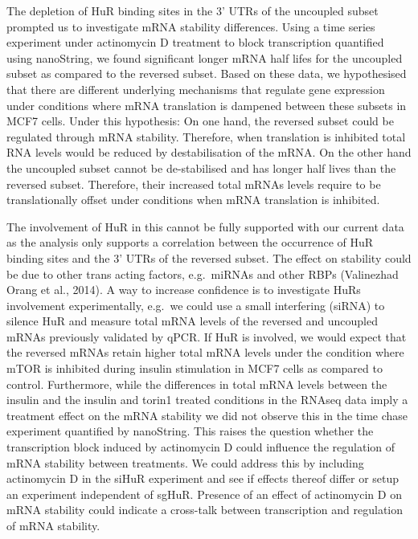 \documentclass[12pt,openany]{book}
\begin{document}
The depletion of HuR binding sites in the 3' UTRs of the uncoupled
subset prompted us to investigate mRNA stability differences. Using a
time series experiment under actinomycin D treatment to block
transcription quantified using nanoString, we found significant longer
mRNA half lifes for the uncoupled subset as compared to the reversed
subset. Based on these data, we hypothesised that there are different
underlying mechanisms that regulate gene expression under conditions
where mRNA translation is dampened between these subsets in MCF7 cells.
Under this hypothesis: On one hand, the reversed subset could be
regulated through mRNA stability. Therefore, when translation is
inhibited total RNA levels would be reduced by destabilisation of the
mRNA. On the other hand the uncoupled subset cannot be de-stabilised and
has longer half lives than the reversed subset. Therefore, their
increased total mRNAs levels require to be translationally offset under
conditions when mRNA translation is inhibited.

The involvement of HuR in this cannot be fully supported with our
current data as the analysis only supports a correlation between the
occurrence of HuR binding sites and the 3' UTRs of the reversed subset.
The effect on stability could be due to other trans acting factors,
e.g.~miRNAs and other RBPs (Valinezhad Orang et al., 2014). A way to
increase confidence is to investigate HuRs involvement experimentally,
e.g.~we could use a small interfering (siRNA) to silence HuR and measure
total mRNA levels of the reversed and uncoupled mRNAs previously
validated by qPCR. If HuR is involved, we would expect that the reversed
mRNAs retain higher total mRNA levels under the condition where mTOR is
inhibited during insulin stimulation in MCF7 cells as compared to
control. Furthermore, while the differences in total mRNA levels between
the insulin and the insulin and torin1 treated conditions in the RNAseq
data imply a treatment effect on the mRNA stability we did not observe
this in the time chase experiment quantified by nanoString. This raises
the question whether the transcription block induced by actinomycin D
could influence the regulation of mRNA stability between treatments. We
could address this by including actinomycin D in the siHuR experiment
and see if effects thereof differ or setup an experiment independent of
sgHuR. Presence of an effect of actinomycin D on mRNA stability could
indicate a cross-talk between transcription and regulation of mRNA
stability.
\end{document}
